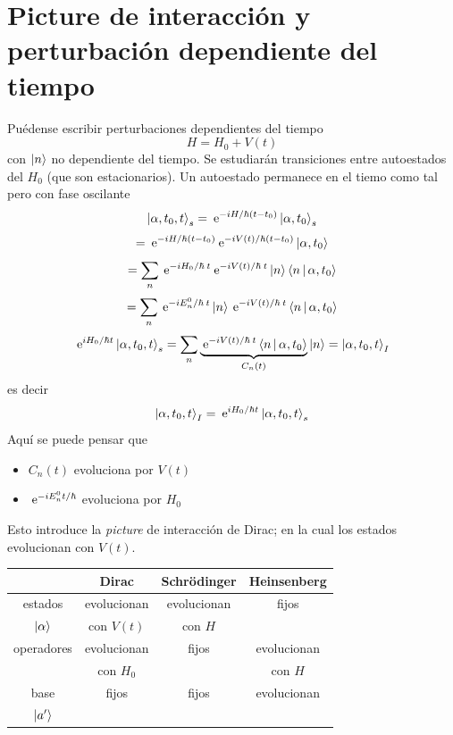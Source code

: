 \documentclass[10pt,oneside]{CBFT_book}
\begin{document}
\chapter{Picture de interacción y perturbación dependiente del tiempo}

Puédense escribir perturbaciones dependientes del tiempo 
\[
	H = H_0 + V(t)
\]
con $\Ket{n}$ no dependiente del tiempo. Se estudiarán transiciones entre autoestados del $H_0$ (que son 
estacionarios). Un autoestado permanece en el tiemo como tal pero con fase oscilante
\[
	\Ket{\alpha,t_0,t}_s = \:\mathrm{e}^{-iH/\hbar(t-t_0)}\Ket{\alpha,t_0}_s
\]
\[
	= \:\mathrm{e}^{-iH/\hbar(t-t_0)} \:\mathrm{e}^{-iV(t)/\hbar(t-t_0)} \Ket{\alpha,t_0}
\]
\[
	= \sum_n \:\mathrm{e}^{-iH_0/\hbar \: t} \:\mathrm{e}^{-iV(t)/\hbar \: t} \ket{n}\Braket{n|\alpha,t_0}
\]
\[
	= \sum_n \:\mathrm{e}^{-iE_n^0/\hbar \: t }\ket{n}\:\mathrm{e}^{-iV(t)/\hbar \: t } \Braket{n|\alpha,t_0}	
\]
\[
	\:\mathrm{e}^{iH_0/\hbar t}\Ket{\alpha,t_0,t}_s =
	\sum_n  \underbrace{\:\mathrm{e}^{-iV(t)/\hbar \: t} \Braket{n|\alpha,t_0}}_{C_n(t)} \ket{n} = \Ket{\alpha,t_0,t}_I	
\]
es decir 
\[
	 \Ket{\alpha,t_0,t}_I = \:\mathrm{e}^{iH_0/\hbar t}\Ket{\alpha,t_0,t}_s
\]
Aquí se puede pensar que 
\begin{itemize}
 \item $C_n(t)$ evoluciona por $V(t)$
 \item $\:\mathrm{e}^{-iE_n^0 t/\hbar}$ evoluciona por $H_0$
\end{itemize}

Esto introduce la {\it picture} de interacción de Dirac; en la cual los estados evolucionan con $V(t)$.

\begin{center}
\begin{tabular}{|c|ccc|}
\hline 
& Dirac & Schrödinger & Heinsenberg \\
\hline 
estados & evolucionan & evolucionan & fijos \\
$\Ket{\alpha}$ & con $V(t)$ & con $H$ &  \\
\hline
operadores & evolucionan & fijos & evolucionan \\
 & con $H_0$ &  & con $H$ \\
\hline
base & fijos & fijos & evolucionan \\
$\Ket{a'}$ &  &  &  \\
\hline 
\end{tabular}
\end{center}
\end{document}
